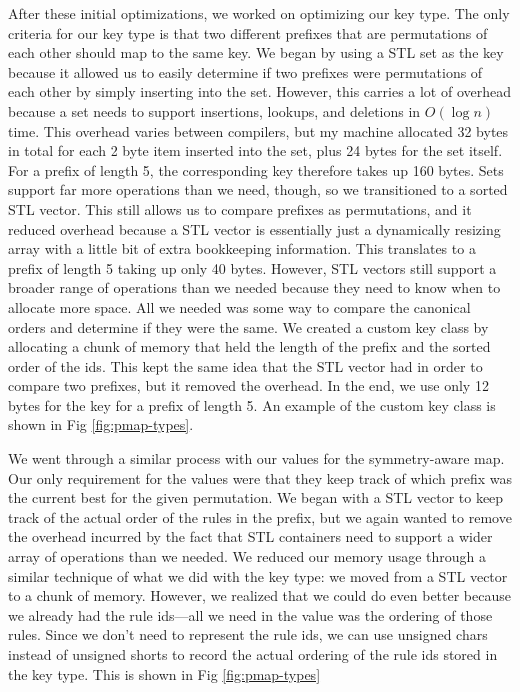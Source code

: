 After these initial optimizations, we worked on optimizing our key type.
The only criteria for our key type is that two different prefixes that are permutations of each other should map to the same key.
We began by using a STL set as the key because it allowed us to easily determine if two prefixes were permutations of each other by simply inserting into the set.
However, this carries a lot of overhead because a set needs to support insertions, lookups, and deletions in $O(\log n)$ time.
This overhead varies between compilers, but my machine allocated 32 bytes in total for each 2 byte item inserted into the set, plus 24 bytes for the set itself.
For a prefix of length 5, the corresponding key therefore takes up 160 bytes.
Sets support far more operations than we need, though, so we transitioned to a sorted STL vector.
This still allows us to compare prefixes as permutations, and it reduced overhead because a STL vector is essentially just a dynamically resizing array with a little bit of extra bookkeeping information.
This translates to a prefix of length 5 taking up only 40 bytes.
However, STL vectors still support a broader range of operations than we needed because they need to know when to allocate more space.
All we needed was some way to compare the canonical orders and determine if they were the same.
We created a custom key class by allocating a chunk of memory that held the length of the prefix and the sorted order of the ids.
This kept the same idea that the STL vector had in order to compare two prefixes, but it removed the overhead.
In the end, we use only 12 bytes for the key for a prefix of length 5.
An example of the custom key class is shown in Fig \ref{fig:pmap-types}.

We went through a similar process with our values for the symmetry-aware map.
Our only requirement for the values were that they keep track of which prefix was the current best for the given permutation.
We began with a STL vector to keep track of the actual order of the rules in the prefix, but we again wanted to remove the overhead incurred by the fact that STL containers need to support a wider array of operations than we needed.
We reduced our memory usage through a similar technique of what we did with the key type: we moved from a STL vector to a chunk of memory.
However, we realized that we could do even better because we already had the rule ids---all we need in the value was the ordering of those rules.
Since we don't need to represent the rule ids, we can use unsigned chars instead of unsigned shorts to record the actual ordering of the rule ids stored in the key type.
This is shown in Fig \ref{fig:pmap-types}

